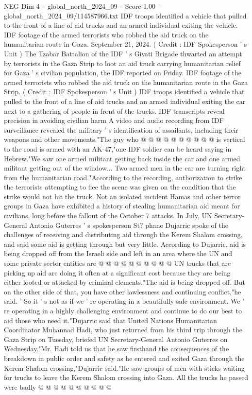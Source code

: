 \begin{textsample}{NEG Dim 4 – global\_north\_2024\_09 – Score 1.00 – global\_north\_2024\_09/114587966.txt}  \label{ex:f4_neg_133}
IDF troops identified a vehicle that pulled to the front of a line of aid trucks and an armed individual exiting the vehicle.
IDF footage of the armed terrorists who robbed the aid truck on the humanitarian route in Gaza.
September 21, 2024. ( Credit : IDF Spokesperson ' s Unit ) The Tzabar Battalion of the IDF ' s Givati Brigade thwarted an attempt by terrorists in the Gaza Strip to loot an aid truck carrying humanitarian relief for Gaza ' s civilian population, the IDF reported on Friday.
IDF footage of the armed terrorists who robbed the aid truck on the humanitarian route in the Gaza Strip. ( Credit : IDF Spokesperson ' s Unit ) IDF troops identified a vehicle that pulled to the front of a line of aid trucks and an armed individual exiting the car next to a gathering of people in front of the trucks.
IDF transcripts reveal precision in avoiding civilian harm A video and audio recording from IDF surveillance revealed the military ' s identification of assailants, including their weapons and other movements."The guy who @ @ @ @ @ @ @ @ @ @ is vertical to the road is armed with an AK-47,"one IDF soldier can be heard saying in Hebrew."We saw one armed militant getting back inside the car and one armed militant getting out of the window...
Two armed men in the car are turning right from the humanitarian road."According to the recording, authorization to strike the terrorists attempting to flee the scene was given on the condition that the strike would not hit the truck.
Not an isolated incident Hamas and other terror groups in Gaza have exhibited a history of stealing humanitarian aid meant for civilians, long before the fallout of the October 7 attacks.
In July, UN Secretary-General Antonio Guterres ' s spokesperson St? phane Dujarric spoke of the challenges of receiving and distributing aid through the Kerem Shalom crossing, and said some aid is getting through but very little.
According to Dujarric, aid is being dropped off from the Israeli side and left in an area where the UN and some private sector entities are @ @ @ @ @ @ @ @ @ @ UN trucks that are picking up aid are doing it often at a significant cost because they are being either looted or attacked by criminal elements."The aid is being dropped off.
But on the other side of that, you have other lawlessness and continuing conflict,"he said. ' So it ' s not as if we ' re operating in a beautifully safe environment.
We ' re operating in a highly challenging environment and continue to do our best to aid those who need it."Dujarric said that United Nations Humanitarian Coordinator Muhannad Hadi, who just returned from his third trip through the Gaza Strip on Tuesday, briefed UN Secretary-General Antonio Guterres on Wednesday."Mr.
Hadi told us that he saw firsthand the consequences of the breakdown in public order and safety as he entered and exited Gaza through the Kerem Shalom crossing,"Dujarric said."He saw groups of men with sticks waiting for trucks to leave the Kerem Shalom crossing into Gaza.
All the trucks he passed were badly @ @ @ @ @ @ @ @ @ @

\end{textsample}
